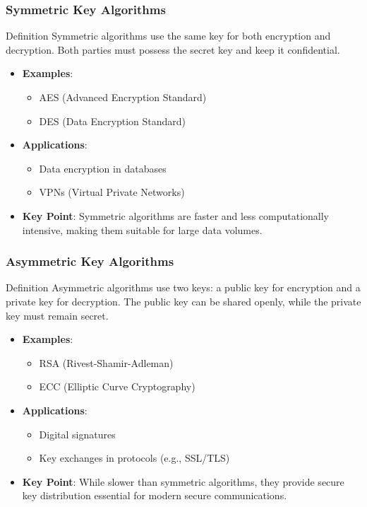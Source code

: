 \documentclass{beamer}
\begin{document}
\begin{frame}[fragile]
    \frametitle{Symmetric Key Algorithms}
    \begin{block}{Definition}
        Symmetric algorithms use the same key for both encryption and decryption. Both parties must possess the secret key and keep it confidential.
    \end{block}
    \begin{itemize}
        \item \textbf{Examples}:
        \begin{itemize}
            \item AES (Advanced Encryption Standard)
            \item DES (Data Encryption Standard)
        \end{itemize}
        \item \textbf{Applications}:
        \begin{itemize}
            \item Data encryption in databases
            \item VPNs (Virtual Private Networks)
        \end{itemize}
        \item \textbf{Key Point}: 
        Symmetric algorithms are faster and less computationally intensive, making them suitable for large data volumes.
    \end{itemize}
\end{frame}

\begin{frame}[fragile]
    \frametitle{Asymmetric Key Algorithms}
    \begin{block}{Definition}
        Asymmetric algorithms use two keys: a public key for encryption and a private key for decryption. The public key can be shared openly, while the private key must remain secret.
    \end{block}
    \begin{itemize}
        \item \textbf{Examples}:
        \begin{itemize}
            \item RSA (Rivest-Shamir-Adleman)
            \item ECC (Elliptic Curve Cryptography)
        \end{itemize}
        \item \textbf{Applications}:
        \begin{itemize}
            \item Digital signatures
            \item Key exchanges in protocols (e.g., SSL/TLS)
        \end{itemize}
        \item \textbf{Key Point}: 
        While slower than symmetric algorithms, they provide secure key distribution essential for modern secure communications.
    \end{itemize}
\end{frame}
\end{document}
